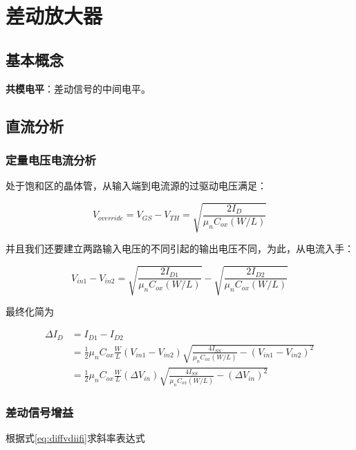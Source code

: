 \documentclass[cn,11pt,chinese,black,simple]{../elegantbook}
\begin{document}
\fi 

\chapter{差动放大器}



\section{基本概念}

\textbf{共模电平}：差动信号的中间电平。

\section{直流分析}

\subsection{定量电压电流分析}

处于饱和区的晶体管，从输入端到电流源的过驱动电压满足：

\[V_{override} = V_{GS} - V_{TH} = \sqrt{\frac{2 I_D}{\mu_n C_{ox}(W/L)}}\]

并且我们还要建立两路输入电压的不同引起的输出电压不同，为此，从电流入手：

\[V_{in1}-V_{in2} = \sqrt{\frac{2 I_{D1}}{\mu_n C_{ox} (W/L)}} - \sqrt{\frac{2 I_{D2}}{\mu_n C_{ox} (W/L)}}\]

最终化简为

\begin{equation}\label{eq:diffvdiifi}
    \begin{aligned}
        \Delta I_D &= I_{D1} - I_{D2} \\
        &= \frac{1}{2} \mu_n C_{ox} \frac{W}{L} (V_{in1} - V_{in2}) \sqrt{\frac{4 I_{SS}}{\mu_n C_{ox} (W/L)} - (V_{in1} - V_{in2})^2}\\
        &= \frac{1}{2} \mu_n C_{ox} \frac{W}{L} (\Delta V_{in}) \sqrt{\frac{4 I_{SS}}{\mu_n C_{ox} (W/L)} - (\Delta V_{in})^2}
    \end{aligned}
\end{equation}



\subsection{差动信号增益}

根据式\ref{eq:diffvdiifi}求斜率表达式
\end{document}
